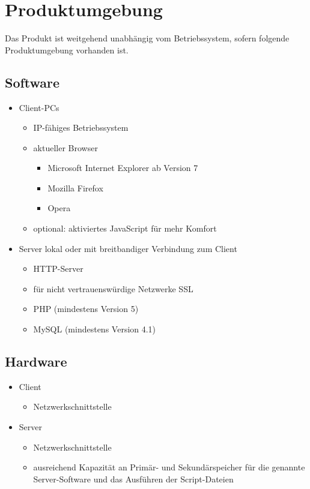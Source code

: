 \documentclass[a4paper,oneside]{scrreprt}
\begin{document}
\chapter{Produktumgebung}

Das Produkt ist weitgehend unabhängig vom Betriebssystem, sofern folgende Produktumgebung vorhanden ist.

\section{Software}

\begin{itemize}
\item Client-PCs
    \begin{itemize}
    \item IP-fähiges Betriebssystem
    \item aktueller Browser
        \begin{itemize}
        \item Microsoft Internet Explorer ab Version 7
        \item Mozilla Firefox
        \item Opera
        \end{itemize}
    \item optional: aktiviertes JavaScript für mehr Komfort
    \end{itemize}

\item Server lokal oder mit breitbandiger Verbindung zum Client
    \begin{itemize}
    \item HTTP-Server
    \item für nicht vertrauenswürdige Netzwerke SSL
    \item PHP (mindestens Version 5)
    \item MySQL (mindestens Version 4.1)
    \end{itemize}
\end{itemize}

\section{Hardware}

\begin{itemize}
\item Client
    \begin{itemize}
    \item Netzwerkschnittstelle
    \end{itemize}
\item Server
    \begin{itemize}
    \item Netzwerkschnittstelle
    \item ausreichend Kapazität an Primär- und Sekundärspeicher für die genannte Server-Software und das Ausführen der Script-Dateien
    \end{itemize}
\end{itemize}
\end{document}
